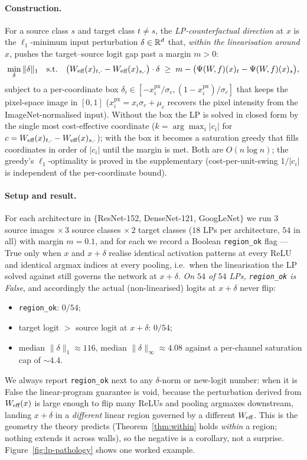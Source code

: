 \paragraph{Construction.}
For a source class $s$ and target class $t\neq s$, the
\emph{LP-counterfactual direction} at $x$ is the $\ell_1$-minimum input
perturbation $\delta\in\mathbb{R}^d$ that, \emph{within the linearisation around
$x$}, pushes the target--source logit gap past a margin $m>0$:
\begin{equation}
\min_{\delta} \|\delta\|_1
\quad\text{s.t.}\quad
\big(W_{\text{eff}}(x)_{t,\cdot}-W_{\text{eff}}(x)_{s,\cdot}\big)\cdot\delta
\;\ge\;
m-\bigl(\Psi(W\!,f)(x)_t-\Psi(W\!,f)(x)_s\bigr),
\label{eq:lp-cf}
\end{equation}
subject to a per-coordinate box $\delta_i\in[-x^{\text{px}}_i/\sigma_c,
(1-x^{\text{px}}_i)/\sigma_c]$ that keeps the pixel-space image in
$[0,1]$ ($x^{\text{px}}_i=x_i\sigma_c+\mu_c$ recovers the pixel
intensity from the ImageNet-normalised input). Without the box the LP is
solved in closed form by the single most cost-effective coordinate
($k=\arg\max_i|c_i|$ for $c=W_{\text{eff}}(x)_{t,\cdot}-W_{\text{eff}}(x)_{s,\cdot}$);
with the box it becomes a saturation greedy that fills coordinates in
order of $|c_i|$ until the margin is met. Both are $O(n\log n)$; the
greedy's $\ell_1$-optimality is proved in the supplementary
(cost-per-unit-swing $1/|c_i|$ is independent of the per-coordinate
bound).

\paragraph{Setup and result.}
For each architecture in $\{$ResNet-152, DenseNet-121, GoogLeNet$\}$ we
run $3$ source images $\times\,3$ source classes $\times\,2$ target
classes ($18$ LPs per architecture, $54$ in all) with margin $m=0.1$,
and for each we record a Boolean \texttt{region\_ok} flag --- True only
when $x$ and $x+\delta$ realise identical activation patterns at every
ReLU and identical argmax indices at every pooling, i.e.\ when the
linearisation the LP solved against still governs the network at
$x+\delta$. \emph{On $54$ of $54$ LPs, \texttt{region\_ok} is False},
and accordingly the actual (non-linearised) logits at $x+\delta$ never
flip:
\begin{itemize}
\item \texttt{region\_ok}: $0/54$;
\item target logit $>$ source logit at $x+\delta$: $0/54$;
\item median $\|\delta\|_1\approx116$, median $\|\delta\|_\infty\approx
4.08$ against a per-channel saturation cap of $\sim4.4$.
\end{itemize}
We always report \texttt{region\_ok} next to any $\delta$-norm or
new-logit number: when it is False the linear-program guarantee is void,
because the perturbation derived from $W_{\text{eff}}(x)$ is large enough to flip
many ReLUs and pooling argmaxes downstream, landing $x+\delta$ in a
\emph{different} linear region governed by a different $W_{\text{eff}}$. This is
the geometry the theory predicts (Theorem~\ref{thm:within} holds
\emph{within} a region; nothing extends it across walls), so the
negative is a corollary, not a surprise. Figure~\ref{fig:lp-pathology}
shows one worked example.


